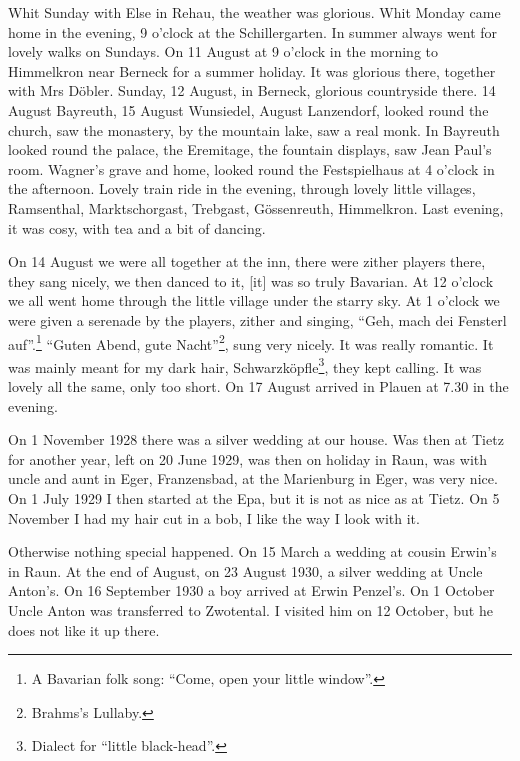 \documentclass[a5paper,11pt,openany]{book}
\newcommand{\seite}[1]{\leavevmode\marginpar{\footnotesize\itshape\raggedright #1}\ignorespaces}
\newcommand{\jahr}[1]{\par\medskip\noindent{\scshape #1}\par\nopagebreak}
\begin{document}
\jahr{Whitsun 1928.}
\seite{8}
Whit Sunday with Else in Rehau, the weather was glorious.
Whit Monday came home in the evening, 9 o'clock at the Schillergarten.
In summer always went for lovely walks on Sundays.
On 11 August at 9 o'clock in the morning to Himmelkron near Berneck for a summer holiday.
It was glorious there, together with Mrs Döbler.
Sunday, 12 August, in Berneck, glorious countryside there.
14 August Bayreuth, 15 August Wunsiedel,
\seite{9}
16 August Lanzendorf, looked round the church, saw the monastery, by the mountain lake, saw a real monk.
In Bayreuth looked round the palace, the Eremitage, the fountain displays, saw Jean Paul's room.
Wagner's grave and home, looked round the Festspielhaus at 4 o'clock in the afternoon.
Lovely train ride in the evening, through lovely little villages, Ramsenthal, Marktschorgast, Trebgast, Gössenreuth, Himmelkron.
Last evening, it was cosy, with tea and a bit of dancing.

\seite{10}
On 14 August we were all together at the inn, there were zither players there,
  they sang nicely, we then danced to it, [it] was so truly Bavarian.
At 12 o'clock we all went home through the little village under the starry sky.
At 1 o'clock we were given a serenade by the players, zither and singing, ``Geh, mach dei Fensterl auf''.\footnote{A Bavarian folk song: ``Come, open your little window''.}
``Guten Abend, gute Nacht''\footnote{Brahms's Lullaby.}, sung very nicely.
It was really romantic.
It was mainly meant for my dark hair, Schwarzköpfle\footnote{Dialect for ``little black-head''.}, they kept calling.
It was lovely all the same, only too short.
On 17 August arrived in Plauen at 7.30 in the evening.

\seite{11}
On 1 November 1928 there was a silver wedding at our house.
Was then at Tietz for another year, left on 20 June 1929, was then on holiday in Raun,
  was with uncle and aunt in Eger, Franzensbad, at the Marienburg in Eger, was very nice.
On 1 July 1929 I then started at the Epa, but it is not as nice as at Tietz.
On 5 November I had my hair cut in a bob, I like the way I look with it.

\jahr{The year 1930.}
\seite{12}
Otherwise nothing special happened.
On 15 March a wedding at cousin Erwin's in Raun.
At the end of August, on 23 August 1930, a silver wedding at Uncle Anton's.
On 16 September 1930 a boy arrived at Erwin Penzel's.
On 1 October Uncle Anton was transferred to Zwotental.
I visited him on 12 October, but he does not like it up there.
\end{document}
